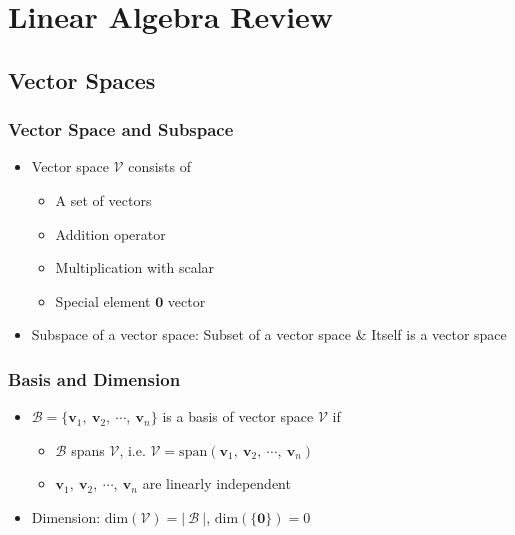 \section{Linear Algebra Review}

\subsection{Vector Spaces}

\subsubsection*{Vector Space and Subspace}
\begin{itemize}
    \item Vector space $\mathcal{V}$ consists of
    \begin{itemize}
        \item A set of vectors
        \item Addition operator
        \item Multiplication with scalar
        \item Special element $\mathbf{0}$ vector
    \end{itemize}
    \item Subspace of a vector space: Subset of a vector space \& Itself is a vector space
\end{itemize}

\subsubsection*{Basis and Dimension}
\begin{itemize}
    \item $\mathcal{B} = \{\mathbf{v}_1,~\mathbf{v}_2,~\cdots,~\mathbf{v}_n\}$ is a basis of vector space $\mathcal{V}$ if
    \begin{itemize}
        \item $\mathcal{B}$ spans $\mathcal{V}$, i.e. $\mathcal{V} = \mathrm{span}(\mathbf{v}_1,~\mathbf{v}_2,~\cdots,~\mathbf{v}_n)$
        \item $\mathbf{v}_1,~\mathbf{v}_2,~\cdots,~\mathbf{v}_n$ are linearly independent
    \end{itemize}
    \item Dimension: $\mathrm{dim}(\mathcal{V}) = |~\mathcal{B}~|$, $\mathrm{dim}(\{\mathbf{0}\}) = 0$
\end{itemize}

